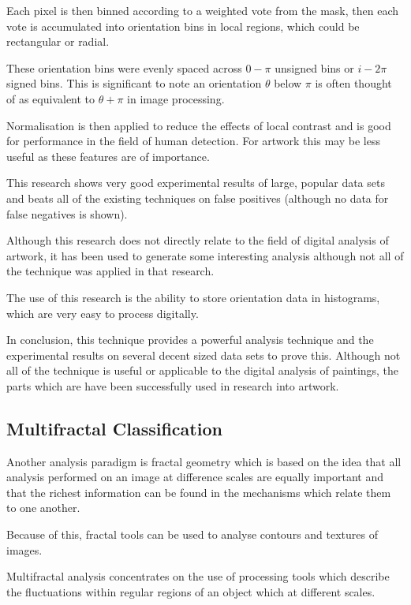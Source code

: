 \documentclass[conference]{IEEEtran}
\begin{document}
Each pixel is then binned according to a weighted vote from the mask, then each
vote is accumulated into orientation bins in local regions, which could be
rectangular or radial.

These orientation bins were evenly spaced across $0-\pi$ unsigned bins or
$i-2\pi$ signed bins. This is significant to note an orientation $\theta$ below
$\pi$ is often thought of as equivalent to $\theta + \pi$ in image processing.

Normalisation is then applied to reduce the effects of local contrast and is
good for performance in the field of human detection. For artwork this may be
less useful as these features are of importance.

This research shows very good experimental results of large, popular data sets
and beats all of the existing techniques on false positives (although no data
for false negatives is shown).

Although this research does not directly relate to the field of digital
analysis of artwork, it has been used to generate some interesting
analysis\cite{brown13can} although not all of the technique was applied in that
research.

The use of this research is the ability to store orientation data in
histograms, which are very easy to process digitally.

In conclusion, this technique provides a powerful analysis technique and the
experimental results on several decent sized data sets to prove this. Although
not all of the technique is useful or applicable to the digital analysis of
paintings, the parts which are have been successfully used in research into
artwork.

\subsection{Multifractal Classification}

Another analysis paradigm is fractal geometry which is based on the idea that
all analysis performed on an image at difference scales are equally important
and that the richest information can be found in the mechanisms which relate
them to one another.

Because of this, fractal tools can be used to analyse contours and textures of
images.

Multifractal analysis concentrates on the use of processing tools which
describe the fluctuations within regular regions of an object which at
different scales.
\end{document}
